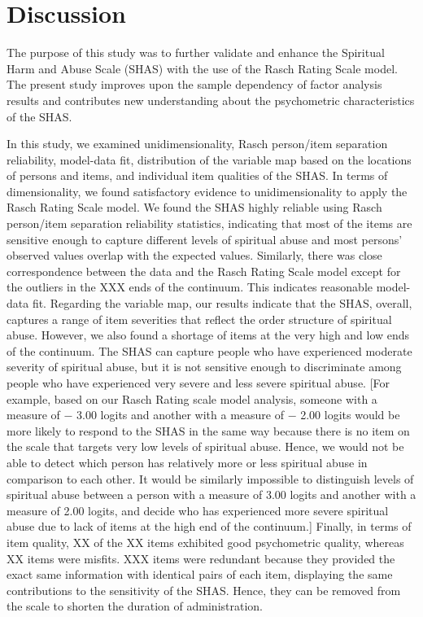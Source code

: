 \documentclass[
]{article}
\begin{document}
\hypertarget{discussion}{%
\section{Discussion}\label{discussion}}

The purpose of this study was to further validate and enhance the Spiritual Harm and Abuse Scale (SHAS) with the use of the Rasch Rating Scale model. The present study improves upon the sample dependency of factor analysis results and contributes new understanding about the psychometric characteristics of the SHAS.

In this study, we examined unidimensionality, Rasch person/item separation reliability, model-data fit, distribution of the variable map based on the locations of persons and items, and individual item qualities of the SHAS. In terms of dimensionality, we found satisfactory evidence to unidimensionality to apply the Rasch Rating Scale model. We found the SHAS highly reliable using Rasch person/item separation reliability statistics, indicating that most of the items are sensitive enough to capture different levels of spiritual abuse and most persons' observed values overlap with the expected values. Similarly, there was close correspondence between the data and the Rasch Rating Scale model except for the outliers in the XXX ends of the continuum. This indicates reasonable model-data fit. Regarding the variable map, our results indicate that the SHAS, overall, captures a range of item severities that reflect the order structure of spiritual abuse. However, we also found a shortage of items at the very high and low ends of the continuum. The SHAS can capture people who have experienced moderate severity of spiritual abuse, but it is not sensitive enough to discriminate among people who have experienced very severe and less severe spiritual abuse. {[}For example, based on our Rasch Rating scale model analysis, someone with a measure of − 3.00 logits and another with a measure of − 2.00 logits would be more likely to respond to the SHAS in the same way because there is no item on the scale that targets very low levels of spiritual abuse. Hence, we would not be able to detect which person has relatively more or less spiritual abuse in comparison to each other. It would be similarly impossible to distinguish levels of spiritual abuse between a person with a measure of 3.00 logits and another with a measure of 2.00 logits, and decide who has experienced more severe spiritual abuse due to lack of items at the high end of the continuum.{]} Finally, in terms of item quality, XX of the XX items exhibited good psychometric quality, whereas XX items were misfits. XXX items were redundant because they provided the exact same information with identical pairs of each item, displaying the same contributions to the sensitivity of the SHAS. Hence, they can be removed from the scale to shorten the duration of administration.
\end{document}
